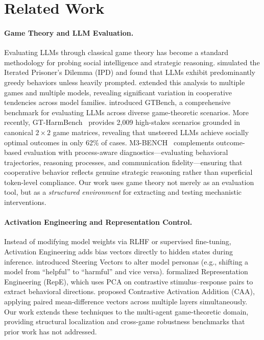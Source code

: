 \documentclass{article}
\begin{document}
\section{Related Work}
\label{sec:related}

\paragraph{Game Theory and LLM Evaluation.}
Evaluating LLMs through classical game theory has become a standard methodology for probing social intelligence and strategic reasoning. \citet{brookman2023playing} simulated the Iterated Prisoner's Dilemma (IPD) and found that LLMs exhibit predominantly greedy behaviors unless heavily prompted. \citet{fan2024can} extended this analysis to multiple games and multiple models, revealing significant variation in cooperative tendencies across model families. \citet{duan2024gtbench} introduced GTBench, a comprehensive benchmark for evaluating LLMs across diverse game-theoretic scenarios. More recently, GT-HarmBench~\citep{cobben2026gtharmbench} provides 2,009 high-stakes scenarios grounded in canonical $2 \times 2$ game matrices, revealing that unsteered LLMs achieve socially optimal outcomes in only 62\% of cases. M3-BENCH~\citep{xie2026m3bench} complements outcome-based evaluation with process-aware diagnostics---evaluating behavioral trajectories, reasoning processes, and communication fidelity---ensuring that cooperative behavior reflects genuine strategic reasoning rather than superficial token-level compliance. Our work uses game theory not merely as an evaluation tool, but as a \textit{structured environment} for extracting and testing mechanistic interventions.

\paragraph{Activation Engineering and Representation Control.}
Instead of modifying model weights via RLHF or supervised fine-tuning, Activation Engineering adds bias vectors directly to hidden states during inference. \citet{turner2023activation} introduced Steering Vectors to alter model personas (e.g., shifting a model from ``helpful'' to ``harmful'' and vice versa). \citet{zou2023representation} formalized Representation Engineering (RepE), which uses PCA on contrastive stimulus--response pairs to extract behavioral directions. \citet{rimsky2023steering} proposed Contrastive Activation Addition (CAA), applying paired mean-difference vectors across multiple layers simultaneously. Our work extends these techniques to the multi-agent game-theoretic domain, providing structural localization and cross-game robustness benchmarks that prior work has not addressed.
\end{document}
